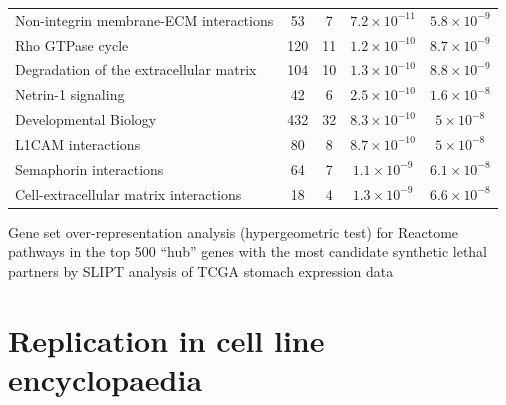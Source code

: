 \begin{table}[!ht]
{\begin{threeparttable}
\begin{tabular}{lcccc}
  \rowcolor{black!10}
  Non-integrin membrane-ECM interactions &  53 &   7 & $7.2 \times 10^{-11}$ & $5.8 \times 10^{-9}$ \\ 
  \rowcolor{black!5}
  Rho GTPase cycle & 120 &  11 & $1.2 \times 10^{-10}$ & $8.7 \times 10^{-9}$ \\ 
  \rowcolor{black!10}
  Degradation of the extracellular matrix & 104 &  10 & $1.3 \times 10^{-10}$ & $8.8 \times 10^{-9}$ \\ 
  \rowcolor{black!5}
  Netrin-1 signaling &  42 &   6 & $2.5 \times 10^{-10}$ & $1.6 \times 10^{-8}$ \\ 
  \rowcolor{black!10}
  Developmental Biology & 432 &  32 & $8.3 \times 10^{-10}$ & $5 \times 10^{-8}$ \\ 
  \rowcolor{black!5}
  L1CAM interactions &  80 &   8 & $8.7 \times 10^{-10}$ & $5 \times 10^{-8}$ \\ 
  \rowcolor{black!10}
  Semaphorin interactions &  64 &   7 & $1.1 \times 10^{-9}$ & $6.1 \times 10^{-8}$ \\ 
  \rowcolor{black!5}
  Cell-extracellular matrix interactions &  18 &   4 & $1.3 \times 10^{-9}$ & $6.6 \times 10^{-8}$ \\ 
   \hline
\end{tabular}
\begin{tablenotes}
\raggedright \small
Gene set over-representation analysis (hypergeometric test) for Reactome pathways in the top 500 ``hub'' genes with the most candidate synthetic lethal partners by SLIPT analysis of TCGA stomach expression data
\end{tablenotes}
\end{threeparttable}
}
\end{table}

\FloatBarrier

\chapter{Replication in cell line encyclopaedia} \label{appendix:CCLE}



